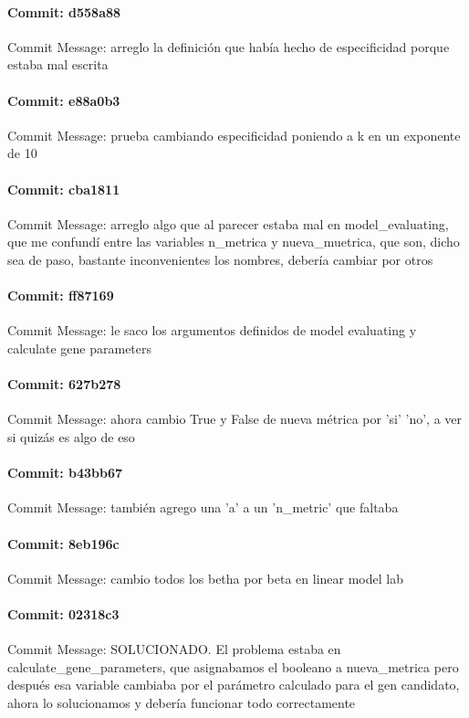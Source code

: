 \documentclass{article}
\begin{document}
\paragraph{Commit: d558a88}
Commit Message: arreglo la definición que había hecho de especificidad porque estaba mal escrita

\paragraph{Commit: e88a0b3}
Commit Message: prueba cambiando especificidad poniendo a k en un exponente de 10

\paragraph{Commit: cba1811}
Commit Message: arreglo algo que al parecer estaba mal en model_evaluating, que me confundí entre las variables n_metrica y nueva_muetrica, que son, dicho sea de paso, bastante inconvenientes los nombres, debería cambiar por otros

\paragraph{Commit: ff87169}
Commit Message: le saco los argumentos definidos de model evaluating y calculate gene parameters

\paragraph{Commit: 627b278}
Commit Message: ahora cambio True y False de nueva métrica por 'si' 'no', a ver si quizás es algo de eso

\paragraph{Commit: b43bb67}
Commit Message: también agrego una 'a' a un 'n_metric' que faltaba

\paragraph{Commit: 8eb196c}
Commit Message: cambio todos los betha por beta en linear model lab

\paragraph{Commit: 02318c3}
Commit Message: SOLUCIONADO. El problema estaba en calculate_gene_parameters, que asignabamos el booleano a nueva_metrica pero después esa variable cambiaba por el parámetro calculado para el gen candidato, ahora lo solucionamos y debería funcionar todo correctamente
\end{document}
